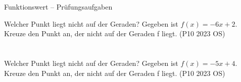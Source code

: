 \begin{aufgabe}{Funktionswert – Prüfungsaufgaben}
\begin{teile}
\teil Welcher Punkt liegt nicht auf der Geraden? Gegeben ist $f(x) = -6x + 2$. Kreuze den Punkt an, der nicht auf der Geraden f liegt. \hfill (P10 2023 OS) \\  \\  \\ 
\teil Welcher Punkt liegt nicht auf der Geraden? Gegeben ist $f(x) = -5x + 4$. Kreuze den Punkt an, der nicht auf der Geraden f liegt. \hfill (P10 2023 OS) \\  \\  \\ 
\end{teile}
\end{aufgabe}
